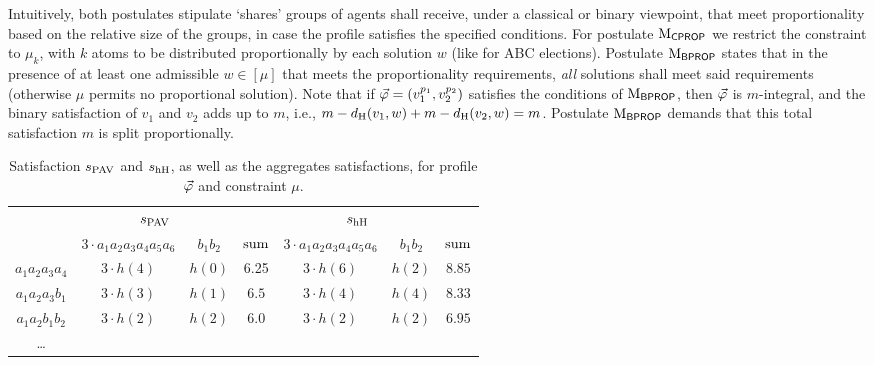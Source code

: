 Intuitively, both postulates stipulate `shares' groups of agents shall receive,
under a classical  or binary viewpoint, 
that meet proportionality based on the relative size of the groups,
in case the profile satisfies the specified conditions. %
For postulate $\ppm{\CPROP}$ we restrict the constraint to $\mu_k$, 
with $k$ atoms to be distributed proportionally by each solution $w$ (like for ABC elections). 
Postulate $\ppm{\BPROP}$ states that in the presence of at least one admissible 
$w \in [\mu]$ that meets the proportionality requirements, 
\emph{all} solutions shall meet said requirements (otherwise $\mu$ permits no proportional solution).
Note that if  
$\P=(v_1^{p_1},v_2^{p_2})$ satisfies the conditions of $\ppm{\BPROP}$, then $\P$ is $m$-integral, and the binary satisfaction 
of $v_1$ and $v_2$ adds up to $m$, i.e., $m-\dd_\hamming(v_1,w)+m-\dd_\hamming(v_2,w)=m$. 
Postulate $\ppm{\BPROP}$ %
demands that this total satisfaction $m$ 
is split proportionally. %

\begin{table}\centering
	\begin{tabular}{ccccccc}
		\toprule
		& \multicolumn{2}{c}{$\sat_\pav$} && \multicolumn{2}{c}{$\sat_\hhamming$}&\\
		& $3\cdot a_1a_2a_3a_4a_5a_6$ & $b_1b_2$  & $\ssum$ & $3\cdot a_1a_2a_3a_4a_5a_6$ & $b_1b_2$& $\ssum$\\
		\midrule
		$a_1a_2a_3a_4$    & $3\cdot h(4)$ & $h(0)$   &6.25& $3\cdot h(6)$ & $h(2)$ & $\mathbf{8.85}$\\
		$a_1a_2a_3b_1$    & $3\cdot h(3)$ &	$h(1)$   &$\mathbf{6.5}$& $3\cdot h(4)$ & $h(4)$  & $8.33$\\
		$a_1a_2b_1b_2$    & $3\cdot h(2)$ &	$h(2)$   &6.0& $3\cdot h(2)$ & $h(2)$  & $6.95$\\
		\dots & \\
		\bottomrule				
	\end{tabular}
	\caption{
		Satisfaction $\sat_\pav$ and $\sat_\hhamming$, as well as the aggregates satisfactions, for profile
		$\P$ and constraint $\mu$.
	}			
	\label{tab:5-classical -binary-proportionality}
\end{table}


